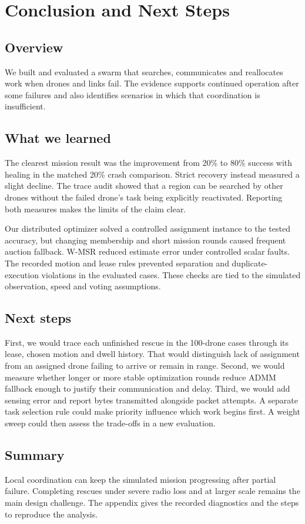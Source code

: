 \chapter{Conclusion and Next Steps}
\section{Overview}
We built and evaluated a swarm that searches, communicates and reallocates work when drones and links fail. The evidence supports continued operation after some failures and also identifies scenarios in which that coordination is insufficient.

\section{What we learned}
The clearest mission result was the improvement from 20\% to 80\% success with healing in the matched 20\% crash comparison. Strict recovery instead measured a slight decline. The trace audit showed that a region can be searched by other drones without the failed drone's task being explicitly reactivated. Reporting both measures makes the limits of the claim clear.

Our distributed optimizer solved a controlled assignment instance to the tested accuracy, but changing membership and short mission rounds caused frequent auction fallback. W-MSR reduced estimate error under controlled scalar faults. The recorded motion and lease rules prevented separation and duplicate-execution violations in the evaluated cases. These checks are tied to the simulated observation, speed and voting assumptions.

\section{Next steps}
First, we would trace each unfinished rescue in the 100-drone cases through its lease, chosen motion and dwell history. That would distinguish lack of assignment from an assigned drone failing to arrive or remain in range. Second, we would measure whether longer or more stable optimization rounds reduce ADMM fallback enough to justify their communication and delay. Third, we would add sensing error and report bytes transmitted alongside packet attempts. A separate task selection rule could make priority influence which work begins first. A weight sweep could then assess the trade-offs in a new evaluation.

\section{Summary}
Local coordination can keep the simulated mission progressing after partial failure. Completing rescues under severe radio loss and at larger scale remains the main design challenge. The appendix gives the recorded diagnostics and the steps to reproduce the analysis.
